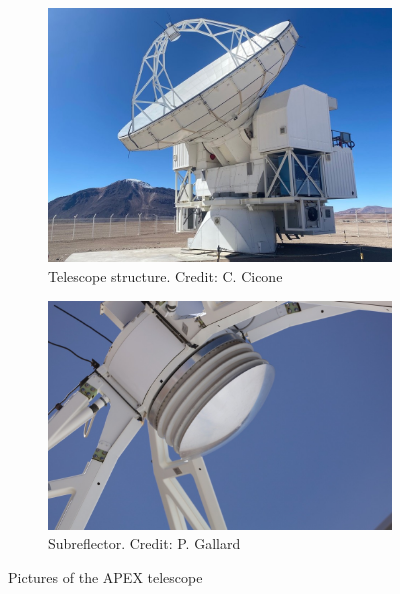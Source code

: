 \begin{figure}[H]
    \centering
    \begin{subfigure}[t]{0.49\textwidth}
        \centering
        \includegraphics[width=\textwidth]{Astronomy/apex_primary_mirror_cropped.jpeg}
        \caption{Telescope structure. Credit: C. Cicone}
        \label{subfig:apex_primary}
    \end{subfigure}
    \hfill
    \begin{subfigure}[t]{0.49\textwidth}
       \centering
       \includegraphics[width=\textwidth]{Astronomy/apex_subreflector.jpeg}
       \caption{Subreflector. Credit: P. Gallard}
       \label{subfig:apex_subref}
    \end{subfigure}
    \caption{Pictures of the APEX telescope}
    \label{fig:apex_images}
\end{figure}


